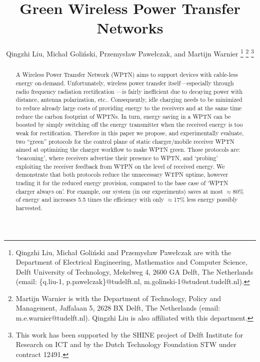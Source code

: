 \documentclass[11pt,draftclsnofoot,journal,onecolumn]{IEEEtran}
\begin{document}
\title{Green Wireless Power Transfer Networks}
\author{Qingzhi Liu, Micha{\l} Goli\'{n}ski, Przemys{\l}aw Pawe{\l}czak, and Martijn Warnier
\thanks{Qingzhi Liu, Micha{\l} Goli\'{n}ski and Przemys{\l}aw Pawe{\l}czak are with the Department of Electrical Engineering, Mathematics and Computer Science, Delft University of Technology, Mekelweg 4, 2600 GA Delft, The Netherlands (email: \{q.liu-1, p.pawelczak\}@tudelft.nl, m.golinski-1@student.tudelft.nl).}
\thanks{Martijn Warnier is with the Department of Technology, Policy and Management, Jaffalaan 5, 2628 BX Delft, The Netherlands (email: m.e.warnier@tudelft.nl). Qingzhi Liu is also affiliated with this department.}
\thanks{This work has been supported by the SHINE project of Delft Institute for Research on ICT and by the Dutch Technology Foundation STW under contract 12491.}}

\maketitle

\begin{abstract}
A Wireless Power Transfer Network (WPTN) aims to support devices with cable-less energy on-demand. Unfortunately, wireless power transfer itself---especially through radio frequency radiation rectification ---is fairly inefficient due to decaying power with distance, antenna polarization, etc.. Consequently, idle charging needs to be minimized to reduce already large costs of providing energy to the receivers and at the same time reduce the carbon footprint of WPTNs. In turn, energy saving in a WPTN can be boosted by simply switching off the energy transmitter when the received energy is too weak for rectification. Therefore in this paper we propose, and experimentally evaluate, two ``green'' protocols for the control plane of static charger/mobile receiver WPTN aimed at optimizing the charger workflow to make WPTN green. Those protocols are: `beaconing', where receivers advertise their presence to WPTN, and `probing' exploiting the receiver feedback from WTPN on the level of received energy. We demonstrate that both protocols reduce the unnecessary WTPN uptime, however trading it for the reduced energy provision, compared to the base case of `WPTN charger always on'. For example, our system (in our experiments) saves at most $\approx$80\% of energy and increases 5.5 times the efficiency with only $\approx$17\% less energy possibly harvested.
\end{abstract}
\end{document}
